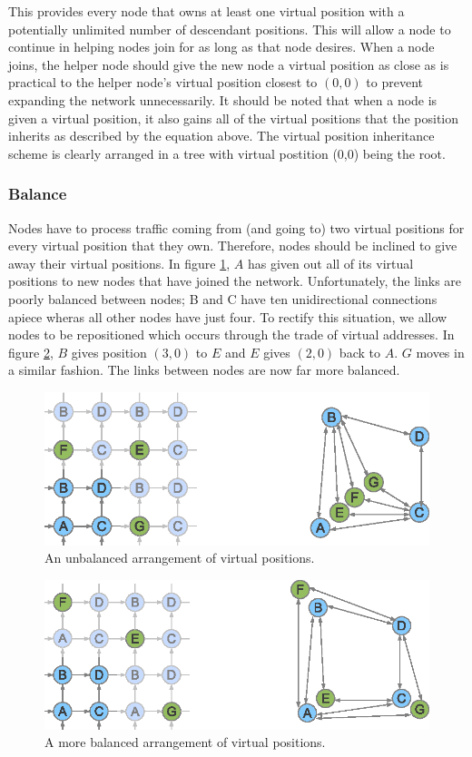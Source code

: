 \documentclass[ %
                    author={Luke Murray},
                supervisor={Dr. Simon Hollis},
                     title={Shadow Peer-to-Peer Networks},
                  subtitle={},
                    degree={MEng},
                      year={2013} ]{thesis}
\begin{document}
This provides every node that owns at least one virtual position with a potentially unlimited number of descendant positions. This will allow a node to continue in helping nodes join for as long as that node desires. When a node joins, the helper node should give the new node a virtual position as close as is practical to the helper node's virtual position closest to $(0, 0)$ to prevent expanding the network unnecessarily. It should be noted that when a node is given a virtual position, it also gains all of the virtual positions that the position inherits as described by the equation above. The virtual position inheritance scheme is clearly arranged in a tree with virtual postition (0,0) being the root.

\subsubsection{Balance}

Nodes have to process traffic coming from (and going to) two virtual positions for every virtual position that they own. Therefore, nodes should be inclined to give away their virtual positions. In figure \ref{balance1}, $A$ has given out all of its virtual positions to new nodes that have joined the network. Unfortunately, the links are poorly balanced between nodes; B and C have ten unidirectional connections apiece wheras all other nodes have just four. To rectify this situation, we allow nodes to be repositioned which occurs through the trade of virtual addresses. In figure \ref{balance2}, $B$ gives position $(3,0)$ to $E$ and $E$ gives $(2,0)$ back to $A$. $G$ moves in a similar fashion. The links between nodes are now far more balanced. 

\begin{figure}[h]
    \centering
    \includegraphics{diagrams/network_balance1.eps}
    \caption{An unbalanced arrangement of virtual positions.}
    \label{balance1}
\end{figure}
\begin{figure}[h]
    \centering
    \includegraphics{diagrams/network_balance2.eps}
    \caption{A more balanced arrangement of virtual positions.}
    \label{balance2}
\end{figure}
\end{document}

